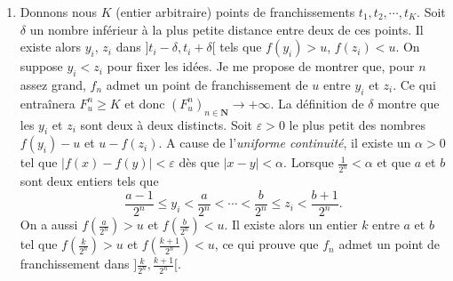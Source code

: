 \begin{enumerate}
\begin{enumerate}
    \item Soit $i\in \{ 1,\cdots ,F_{u}\} $ $I_{i}$ l'intervalle d{\'e}fini dans la question pr{\'e}c{\'e}dente.
Comme $t_{i}$ est un point de franchissement, il existe $\theta _{1}$ et $\theta_{2}$ dans $I_{i}$ tels que $f(\theta _{1})>u$ et $f(\theta_{2})<u$.
Comme $f$ est continue en $\theta _{1}$, il existe $J_{i}$ assez petit pour {\^e}tre inclus dans $I_{i} $ et pour que $f-u$ reste strictement positive dans $J_{i}$.
De m{\^e}me, l'existence de $K_{i}$ est assur{\'e}e par la continuit{\'e} de $f$ en $\theta _{2}$.

    \item Lorsque $2^{-n}$ est plus petit que la plus petite longueur des intervalles $J_{i}$ et $K_{i}$ de la question pr{\'e}c{\'e}dente, chaque point de franchissement se trouve dans
un seul des intervalles de la subdivision associ{\'e}e {\`a} $f_{n}$, chacun de ces intervalles contient
exactement un des points de franchissement donc $F_{u}^{n}=F_{u}$.
La suite $(F_{u}^{n})_{n\in \mathbf{N}}$ est stationnaire de valeur $F_{u}$.
  \end{enumerate}

  \item Donnons nous $K$ (entier arbitraire) points de franchissements $t_{1},t_{2},\cdots ,t_{K}$.\newline
Soit $\delta $ un nombre inf{\'e}rieur {\`a} la plus petite distance entre deux de ces points.
Il existe alors $y_{i}$, $z_{i}$ dans $] t_{i}-\delta ,t_{i}+\delta [ $ tels que $f(y_{i})>u$, $f(z_{i})<u$.
On suppose $y_{i}<z_{i}$ pour fixer les id{\'e}es.
Je me propose de montrer que, pour $n$ assez grand, $f_{n}$ admet un point de franchissement de $u$ entre $y_{i}$ et $z_{i}$.
Ce qui entra\^{i}nera $F_{u}^{n}\geq K$ et donc $(F_{u}^{n})_{n\in \mathbf{N}} \rightarrow +\infty $.\newline
La d{\'e}finition de $\delta $ montre que les $y_{i}$ et $z_{i}$ sont deux {\`a} deux distincts.
Soit $\varepsilon >0$ le plus petit des nombres $f(y_{i})-u$ et $u-f(z_{i})$. A cause de l'\emph{uniforme continuit{\'e}}, il existe un $\alpha >0$ tel que
$| f(x)-f(y)| <\varepsilon $ d{\`e}s que $| x-y| <\alpha $.\newline
Lorsque $\frac{1}{2^{n}}<\alpha $ et que $a$ et $b$ sont deux entiers tels que
\[
\frac{a-1}{2^{n}}\leq y_{i}<\frac{a}{2^{n}}<\cdots
<\frac{b}{2^{n}}\leq z_{i}<\frac{b+1}{2^{n}}.
\]
On a aussi $f(\frac{a}{2^{n}})>u$ et $f(\frac{b}{2^{n}})<u$.
Il existe alors un entier $k$ entre $a$ et $b$ tel que $f(\frac{k}{2^{n}})>u$ et $f(\frac{k+1}{2^{n}})<u$, ce qui prouve que $f_{n}$ admet un point de
franchissement dans $] \frac{k}{2^{n}},\frac{k+1}{2^{n}}[ $.


\end{enumerate}
